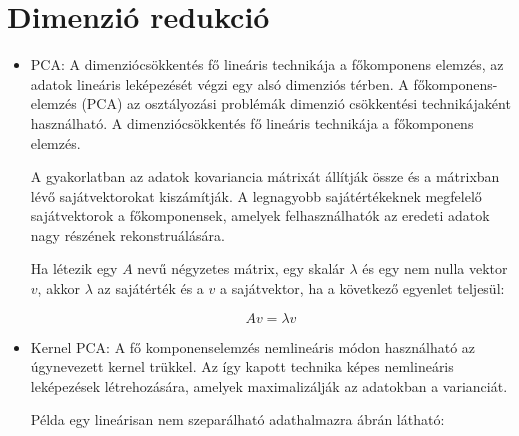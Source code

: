 \section{Dimenzió redukció}
\begin{itemize}
\item PCA: A dimenziócsökkentés\cite{wang2003feature} fő lineáris technikája a főkomponens elemzés, az adatok lineáris leképezését végzi egy alsó dimenziós térben. A főkomponens-elemzés (PCA) az osztályozási problémák dimenzió csökkentési technikájaként használható. A dimenziócsökkentés fő lineáris technikája a főkomponens elemzés.

A gyakorlatban az adatok kovariancia mátrixát állítják össze és a mátrixban lévő sajátvektorokat kiszámítják. A legnagyobb sajátértékeknek megfelelő sajátvektorok a főkomponensek, amelyek felhasználhatók az eredeti adatok nagy részének rekonstruálására.

Ha létezik egy $A$ nevű négyzetes mátrix, egy skalár $\lambda$ és egy nem nulla vektor $v$, akkor $\lambda$ az sajátérték és a $v$ a sajátvektor, ha a következő egyenlet teljesül:

$$
Av = \lambda v
$$

\item Kernel PCA: A fő komponenselemzés nemlineáris módon használható az úgynevezett kernel trükkel. Az így kapott technika képes nemlineáris leképezések létrehozására, amelyek maximalizálják az adatokban a varianciát.

Példa egy lineárisan nem szeparálható adathalmazra  ábrán látható:


\end{itemize}
